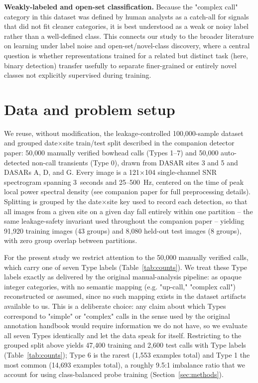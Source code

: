 \documentclass{article}
\begin{document}
\textbf{Weakly-labeled and open-set classification.} Because the "complex
call" category in this dataset was defined by human analysts as a
catch-all for signals that did not fit cleaner categories, it is best
understood as a weak or noisy label rather than a well-defined class. This
connects our study to the broader literature on learning under label
noise and open-set/novel-class discovery, where a central question is
whether representations trained for a related but distinct task (here,
binary detection) transfer usefully to separate finer-grained or entirely
novel classes not explicitly supervised during training.

\section{Data and problem setup}
\label{sec:data}

We reuse, without modification, the leakage-controlled 100{,}000-sample
dataset and grouped date$\times$site train/test split described in the
companion detector paper: 50{,}000 manually verified bowhead calls (Types
1--7) and 50{,}000 auto-detected non-call transients (Type 0), drawn from
DASAR sites 3 and 5 and DASARs A, D, and G. Every image is a 121$\times$104
single-channel SNR spectrogram spanning 3~seconds and 25--500~Hz, centered
on the time of peak local power spectral density (see companion paper for
full preprocessing details). Splitting is grouped by the
date$\times$site key used to record each detection, so that all images
from a given site on a given day fall entirely within one partition --
the same leakage-safety invariant used throughout the companion paper --
yielding 91{,}920 training images (43 groups) and 8{,}080 held-out test
images (8 groups), with zero group overlap between partitions.

For the present study we restrict attention to the 50{,}000 manually
verified calls, which carry one of seven Type labels (Table~\ref{tab:counts}).
We treat these Type labels exactly as delivered by the original
manual-analysis pipeline: as opaque integer categories, with no semantic
mapping (e.g. "up-call," "complex call") reconstructed or assumed, since no
such mapping exists in the dataset artifacts available to us. This is a
deliberate choice: any claim about which Types correspond to "simple" or
"complex" calls in the sense used by the original annotation handbook would
require information we do not have, so we evaluate all seven Types
identically and let the data speak for itself. Restricting to the grouped
split above yields 47{,}400 training and 2{,}600 test calls with Type
labels (Table~\ref{tab:counts}); Type 6 is the rarest (1{,}553 examples
total) and Type 1 the most common (14{,}693 examples total), a roughly
9.5:1 imbalance ratio that we account for using class-balanced probe
training (Section~\ref{sec:methods}).
\end{document}

